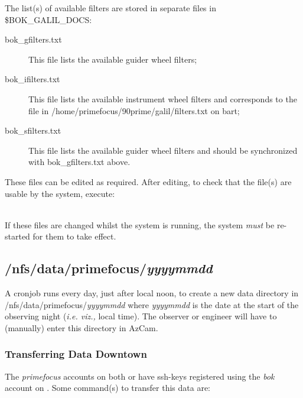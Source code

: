 \documentclass[12pt,twoside]{article}
\begin{document}
\noindent The list(s) of available filters are stored in separate files in \$BOK\_GALIL\_DOCS:

\begin{description}
 \item[bok\_gfilters.txt] This file lists the available guider wheel filters;
 \item[bok\_ifilters.txt] This file lists the available instrument wheel filters and corresponds to the file in
                          /home/primefocus/90prime/galil/filters.txt on {\sc bart};
 \item[bok\_sfilters.txt] This file lists the available guider wheel filters and should be synchronized with 
                          bok\_gfilters.txt above.
\end{description}

\noindent These files can be edited as required. After editing, to check that the file(s) are usable by the system, execute: \\




 \\

\noindent If these files are changed whilst the system is running, the system \emph{must} be re-started for them to take effect.

\subsection{/nfs/data/primefocus/\emph{yyyymmdd}}
\label{datadirectory}

A cronjob runs every day, just after local noon, to create a new data directory in /nfs/data/primefocus/\emph{yyyymmdd} where \emph{yyyymmdd} is the date at the start of the observing night (\emph{i.e. viz.,} local time). The observer or engineer will have to (manually) enter this directory in AzCam.

\subsubsection{Transferring Data Downtown}
\label{Transferring Data Downtown}

The \emph{primefocus} accounts on both  or  have ssh-keys registered using the \emph{bok}
account on . Some command(s) to transfer this data are: \\
 
\end{document}
